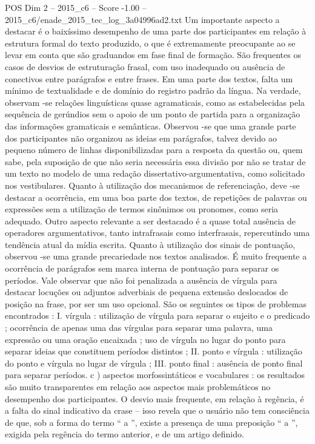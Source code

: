 \begin{textsample}{POS Dim 2 – 2015\_c6 – Score -1.00 – 2015\_c6/enade\_2015\_tec\_log\_3a04996ad2.txt}
Um importante aspecto a destacar é o baixíssimo desempenho de uma parte dos participantes em relação à estrutura formal do texto produzido, o que é extremamente preocupante ao se levar em conta que são graduandos em fase final de formação.
São frequentes os casos de desvios de estruturação frasal, com uso inadequado ou ausência de conectivos entre parágrafos e entre frases.
Em uma parte dos textos, falta um mínimo de textualidade e de domínio do registro padrão da língua.
Na verdade, observam -se relações linguísticas quase agramaticais, como as estabelecidas pela sequência de gerúndios sem o apoio de um ponto de partida para a organização das informações gramaticais e semânticas.
Observou -se que uma grande parte dos participantes não organizou as ideias em parágrafos, talvez devido ao pequeno número de linhas disponibilizadas para a resposta da questão ou, quem sabe, pela suposição de que não seria necessária essa divisão por não se tratar de um texto no modelo de uma redação dissertativo-argumentativa, como solicitado nos vestibulares.
Quanto à utilização dos mecanismos de referenciação, deve -se destacar a ocorrência, em uma boa parte dos textos, de repetições de palavras ou expressões sem a utilização de termos sinônimos ou pronomes, como seria adequado.
Outro aspecto relevante a ser destacado é a quase total ausência de operadores argumentativos, tanto intrafrasais como interfrasais, repercutindo uma tendência atual da mídia escrita.
Quanto à utilização dos sinais de pontuação, observou -se uma grande precariedade nos textos analisados.
É muito frequente a ocorrência de parágrafos sem marca interna de pontuação para separar os períodos.
Vale observar que não foi penalizada a ausência de vírgula para destacar locuções ou adjuntos adverbiais de pequena extensão deslocados de posição na frase, por ser um uso opcional.
São os seguintes os tipos de problemas encontrados : I. vírgula : utilização de vírgula para separar o sujeito e o predicado ; ocorrência de apenas uma das vírgulas para separar uma palavra, uma expressão ou uma oração encaixada ; uso de vírgula no lugar do ponto para separar ideias que constituem períodos distintos ; II. ponto e vírgula : utilização do ponto e vírgula no lugar de vírgula ; III. ponto final : ausência de ponto final para separar períodos. c ) aspectos morfossintáticos e vocabulares : os resultados são muito transparentes em relação aos aspectos mais problemáticos no desempenho dos participantes.
O desvio mais frequente, em relação à regência, é a falta do sinal indicativo da crase – isso revela que o usuário não tem consciência de que, sob a forma do termo “ a ”, existe a presença de uma preposição “ a ”, exigida pela regência do termo anterior, e de um artigo definido.

\end{textsample}
